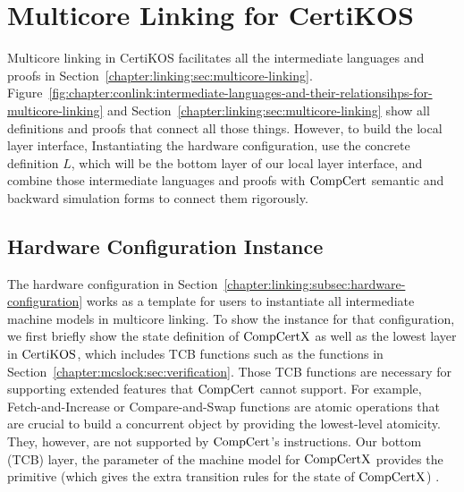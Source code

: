 \section{Multicore Linking for CertiKOS}
\label{chapter:certikos:sec:multicore-linking-for-certikos}

Multicore linking in CertiKOS facilitates all the intermediate languages
and proofs in Section~\ref{chapter:linking:sec:multicore-linking}.
Figure~\ref{fig:chapter:conlink:intermediate-languages-and-their-relationsihps-for-multicore-linking} and 
Section~\ref{chapter:linking:sec:multicore-linking} show all definitions and 
proofs that connect all those things. 
However, to build the local layer interface, 
Instantiating the hardware configuration, 
use the concrete definition $L$, which will be the 
bottom layer of our local layer interface, 
and combine those intermediate languages and proofs with $\mathrm{CompCert}$ semantic and backward simulation 
forms to connect them rigorously. 

\subsection{Hardware Configuration Instance}
\label{chapter:certikos:subsec:hardware-configuration-instance}

The hardware configuration in Section~\ref{chapter:linking:subsec:hardware-configuration} works as a 
template for users to instantiate all intermediate machine models in multicore linking. 
To show the instance for that configuration,
we first briefly show the state definition of $\mathrm{CompCertX}$
as well as the lowest layer in $\mathrm{CertiKOS}$, which includes TCB functions such as the functions in Section~\ref{chapter:mcslock:sec:verification}.
Those TCB functions are 
necessary for supporting extended features that $\mathrm{CompCert}$ cannot support. 
For example, 
Fetch-and-Increase or Compare-and-Swap functions are atomic operations that are crucial to build a 
concurrent object by providing the lowest-level atomicity. 
They, however, are not supported by $\mathrm{CompCert}$'s instructions.
Our bottom (TCB) layer, the parameter of the machine model for $\mathrm{CompCertX}$ 
provides the primitive (which gives the extra transition rules for the state of $\mathrm{CompCertX}$) . 
%
%


